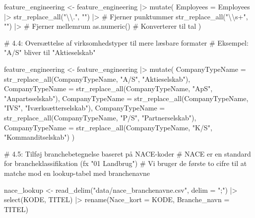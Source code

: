 \documentclass[
  11pt,
  letterpaper,
  DIV=11,
  numbers=noendperiod]{scrartcl}
\newenvironment{Shaded}{\begin{snugshade}}{\end{snugshade}}
\newcommand{\AttributeTok}[1]{\textcolor[rgb]{0.40,0.45,0.13}{#1}}
\newcommand{\CommentTok}[1]{\textcolor[rgb]{0.37,0.37,0.37}{#1}}
\newcommand{\FunctionTok}[1]{\textcolor[rgb]{0.28,0.35,0.67}{#1}}
\newcommand{\NormalTok}[1]{\textcolor[rgb]{0.00,0.23,0.31}{#1}}
\newcommand{\OtherTok}[1]{\textcolor[rgb]{0.00,0.23,0.31}{#1}}
\newcommand{\SpecialCharTok}[1]{\textcolor[rgb]{0.37,0.37,0.37}{#1}}
\newcommand{\StringTok}[1]{\textcolor[rgb]{0.13,0.47,0.30}{#1}}
\begin{document}
\begin{Shaded}
\begin{Highlighting}[]
\NormalTok{feature\_engineering }\OtherTok{\textless{}{-}}\NormalTok{ feature\_engineering }\SpecialCharTok{|\textgreater{}}
  \FunctionTok{mutate}\NormalTok{(}
    \AttributeTok{Employees =}\NormalTok{ Employees }\SpecialCharTok{|\textgreater{}} 
      \FunctionTok{str\_replace\_all}\NormalTok{(}\StringTok{"}\SpecialCharTok{\textbackslash{}\textbackslash{}}\StringTok{."}\NormalTok{, }\StringTok{""}\NormalTok{) }\SpecialCharTok{|\textgreater{}}       \CommentTok{\# Fjerner punktummer}
      \FunctionTok{str\_replace\_all}\NormalTok{(}\StringTok{"}\SpecialCharTok{\textbackslash{}\textbackslash{}}\StringTok{s+"}\NormalTok{, }\StringTok{""}\NormalTok{) }\SpecialCharTok{|\textgreater{}}      \CommentTok{\# Fjerner mellemrum}
      \FunctionTok{as.numeric}\NormalTok{()                        }\CommentTok{\# Konverterer til tal}
\NormalTok{  )}


\CommentTok{\# 4.4: Oversættelse af virksomhedstyper til mere læsbare formater}
\CommentTok{\# Eksempel: "A/S" bliver til "Aktieselskab"}

\NormalTok{feature\_engineering }\OtherTok{\textless{}{-}}\NormalTok{ feature\_engineering }\SpecialCharTok{|\textgreater{}}
  \FunctionTok{mutate}\NormalTok{(}
\AttributeTok{CompanyTypeName =} \FunctionTok{str\_replace\_all}\NormalTok{(CompanyTypeName, }\StringTok{"A/S"}\NormalTok{, }\StringTok{"Aktieselskab"}\NormalTok{),}
\AttributeTok{CompanyTypeName =} \FunctionTok{str\_replace\_all}\NormalTok{(CompanyTypeName, }\StringTok{"ApS"}\NormalTok{, }\StringTok{"Anpartsselskab"}\NormalTok{),}
\AttributeTok{CompanyTypeName =} \FunctionTok{str\_replace\_all}\NormalTok{(CompanyTypeName, }\StringTok{"IVS"}\NormalTok{, }\StringTok{"Iværksætterselskab"}\NormalTok{),}
\AttributeTok{CompanyTypeName =} \FunctionTok{str\_replace\_all}\NormalTok{(CompanyTypeName, }\StringTok{"P/S"}\NormalTok{, }\StringTok{"Partnerselskab"}\NormalTok{),}
\AttributeTok{CompanyTypeName =} \FunctionTok{str\_replace\_all}\NormalTok{(CompanyTypeName, }\StringTok{"K/S"}\NormalTok{, }\StringTok{"Kommanditselskab"}\NormalTok{)}
\NormalTok{  )}


\CommentTok{\# 4.5: Tilføj branchebetegnelse baseret på NACE{-}koder}
\CommentTok{\# NACE er en standard for brancheklassifikation (fx "01 Landbrug")}
\CommentTok{\# Vi bruger de første to cifre til at matche mod en lookup{-}tabel med branchenavne}

\NormalTok{nace\_lookup }\OtherTok{\textless{}{-}} \FunctionTok{read\_delim}\NormalTok{(}\StringTok{"data/nace\_branchenavne.csv"}\NormalTok{, }\AttributeTok{delim =} \StringTok{";"}\NormalTok{) }\SpecialCharTok{|\textgreater{}} 
  \FunctionTok{select}\NormalTok{(KODE, TITEL) }\SpecialCharTok{|\textgreater{}} 
  \FunctionTok{rename}\NormalTok{(}\AttributeTok{Nace\_kort =}\NormalTok{ KODE, }\AttributeTok{Branche\_navn =}\NormalTok{ TITEL)}
\end{Highlighting}
\end{Shaded}
\end{document}
